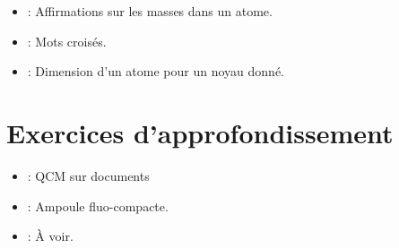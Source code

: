 \documentclass[12pt,a4paper]{article}
\begin{document}
\begin{myexos}
	\begin{itemize}
		\item {} : Affirmations sur les masses dans  un atome.
		\item {} : Mots croisés.
		\item {} : Dimension d'un atome pour un noyau donné. 
	
	\end{itemize}
\end{myexos}

\section{Exercices d'approfondissement}


\begin{myexos}
	\begin{itemize}
		\item {} : QCM sur documents
		\item {} : Ampoule fluo-compacte.
		\item {} : \`A voir. 
		
	\end{itemize}
\end{myexos}
\end{document}
